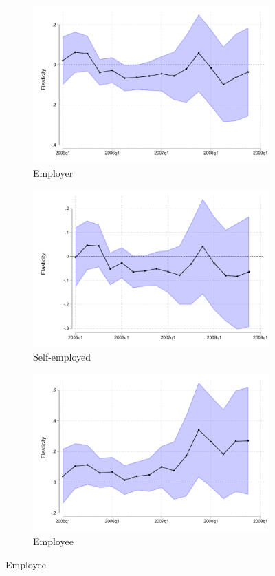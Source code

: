 \begin{figure}[H]
     \caption{Dynamic second stage}
     \vspace{-.2in}
    \label{iv_sp_dynamic}
\begin{center}
\begin{subfigure}{0.325\textwidth}
\caption{Employer}
        \includegraphics[width=\textwidth]{Figuras/IV_SP_p_t_.pdf}
    \end{subfigure}
\begin{subfigure}{0.325\textwidth}
\caption{Self-employed}
        \includegraphics[width=\textwidth]{Figuras/IV_SP_p_1_.pdf}
    \end{subfigure}
\begin{subfigure}{0.325\textwidth}
\caption{Employee}
        \includegraphics[width=\textwidth]{Figuras/IV_SP_e_t_.pdf}

\end{subfigure}
\end{center}
\end{figure}
